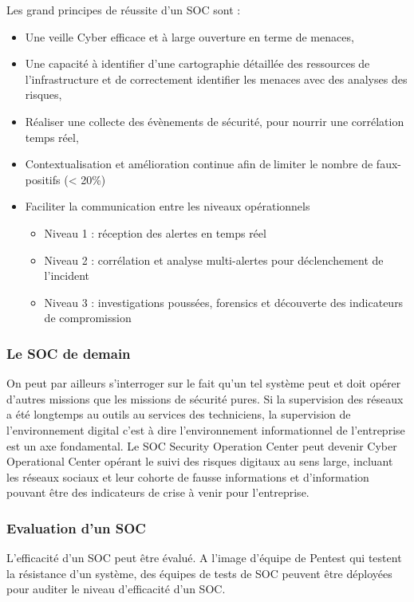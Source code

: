 Les grand principes de réussite d’un SOC sont : 
\begin{itemize}
  \item Une veille Cyber efficace et à large ouverture en terme de menaces,
  \item Une capacité à identifier d’une cartographie détaillée des ressourcesde l’infrastructure et de correctement identifier les menaces avec des analyses des risques,
  \item Réaliser une collecte des évènements de sécurité, pour nourrir une corrélation temps réel,
  \item Contextualisation et amélioration continue afin delimiter le nombre de faux-positifs (< 20\%)
  \item Faciliter la communication entre les niveaux opérationnels
		\begin{itemize}
  				\item Niveau 1 : réception des alertes en temps réel
				\item Niveau 2 : corrélation et analyse multi-alertes pour déclenchement de l’incident
				\item Niveau 3 : investigations poussées, forensics et découverte des indicateurs de compromission
			\end{itemize}
\end{itemize}


\subsubsection{Le SOC de demain}
On peut par ailleurs s'interroger sur le fait qu'un tel système peut et doit opérer d'autres missions que les missions de sécurité pures. Si la supervision des réseaux a été longtemps au outils au services des techniciens, la supervision de l'environnement digital c'est à dire l'environnement informationnel de l'entreprise est un axe fondamental. Le SOC Security Operation Center peut devenir Cyber Operational Center opérant le suivi des risques digitaux au sens large, incluant les réseaux sociaux et leur cohorte de fausse informations et d'information pouvant être des indicateurs de crise à venir pour l'entreprise.

\subsubsection{Evaluation d'un SOC}

L'efficacité d'un SOC peut être évalué. A l'image d'équipe de Pentest qui testent la résistance d'un système, des équipes de tests de SOC peuvent être déployées pour auditer le niveau d'efficacité d'un SOC.

